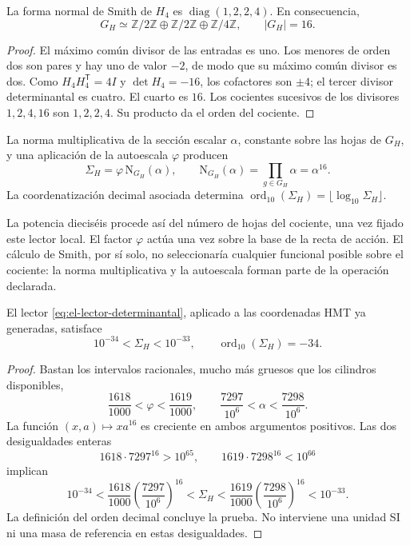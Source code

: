 \begin{lemma}
La forma normal de Smith de \(H_4\) es
\(\operatorname{diag}(1,2,2,4)\). En consecuencia,
\[
 G_H\simeq\mathbb Z/2\mathbb Z\oplus\mathbb Z/2\mathbb Z
 \oplus\mathbb Z/4\mathbb Z,\qquad |G_H|=16.
\]
\end{lemma}
\begin{proof}
El máximo común divisor de las entradas es uno. Los menores de orden dos
son pares y hay uno de valor \(-2\), de modo que su máximo común divisor
es dos. Como \(H_4H_4^{\mathsf T}=4I\) y \(\det H_4=-16\), los
cofactores son \(\pm4\); el tercer divisor determinantal es cuatro.
El cuarto es \(16\). Los cocientes sucesivos de los divisores
\(1,2,4,16\) son \(1,2,2,4\). Su producto da el orden del cociente.
\end{proof}

\begin{definition}
La norma multiplicativa de la sección escalar \(\alpha\), constante
sobre las hojas de \(G_H\), y una aplicación de la autoescala
\(\varphi\) producen
\begin{equation}
 \Sigma_H=\varphi\,\mathrm N_{G_H}(\alpha),\qquad
 \mathrm N_{G_H}(\alpha)=\prod_{g\in G_H}\alpha=\alpha^{16}.
 \label{eq:el-lector-determinantal}
\end{equation}
La coordenatización decimal asociada determina
\(\operatorname{ord}_{10}(\Sigma_H)=\lfloor\log_{10}\Sigma_H\rfloor\).
\end{definition}

La potencia dieciséis procede así del número de hojas del cociente, una
vez fijado este lector local. El factor \(\varphi\) actúa una vez sobre
la base de la recta de acción. El cálculo de Smith, por sí solo, no
seleccionaría cualquier funcional posible sobre el cociente: la norma
multiplicativa y la autoescala forman parte de la operación declarada.

\begin{theorem}
El lector \eqref{eq:el-lector-determinantal}, aplicado a las coordenadas
HMT ya generadas, satisface
\begin{equation}
 10^{-34}<\Sigma_H<10^{-33},\qquad
 \operatorname{ord}_{10}(\Sigma_H)=-34.
 \label{eq:el-decada}
\end{equation}
\end{theorem}
\begin{proof}
Bastan los intervalos racionales, mucho más gruesos que los cilindros
disponibles,
\[
 \frac{1618}{1000}<\varphi<\frac{1619}{1000},\qquad
 \frac{7297}{10^6}<\alpha<\frac{7298}{10^6}.
\]
La función \((x,a)\mapsto xa^{16}\) es creciente en ambos argumentos
positivos. Las dos desigualdades enteras
\[
 1618\cdot7297^{16}>10^{65},\qquad
 1619\cdot7298^{16}<10^{66}
\]
implican
\[
 10^{-34}
 <\frac{1618}{1000}\left(\frac{7297}{10^6}\right)^{16}
 <\Sigma_H
 <\frac{1619}{1000}\left(\frac{7298}{10^6}\right)^{16}
 <10^{-33}.
\]
La definición del orden decimal concluye la prueba. No interviene una
unidad SI ni una masa de referencia en estas desigualdades.
\end{proof}


